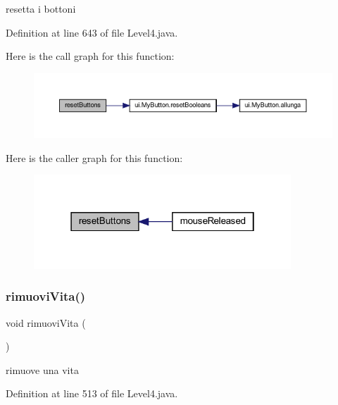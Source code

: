 resetta i bottoni 



Definition at line 643 of file Level4.\+java.

Here is the call graph for this function\+:\nopagebreak
\begin{figure}[H]
\begin{center}
\leavevmode
\includegraphics[width=350pt]{classscenes_1_1_level4_a548cf4795e9d559d0c0cce0bb57a5251_cgraph}
\end{center}
\end{figure}
Here is the caller graph for this function\+:\nopagebreak
\begin{figure}[H]
\begin{center}
\leavevmode
\includegraphics[width=274pt]{classscenes_1_1_level4_a548cf4795e9d559d0c0cce0bb57a5251_icgraph}
\end{center}
\end{figure}
\mbox{\label{classscenes_1_1_level4_a484775c889ccd8602b66ad795b141534}} 
\subsubsection{\texorpdfstring{rimuovi\+Vita()}{rimuoviVita()}}
{\footnotesize\ttfamily void rimuovi\+Vita (\begin{DoxyParamCaption}{ }\end{DoxyParamCaption})}



rimuove una vita 



Definition at line 513 of file Level4.\+java.


